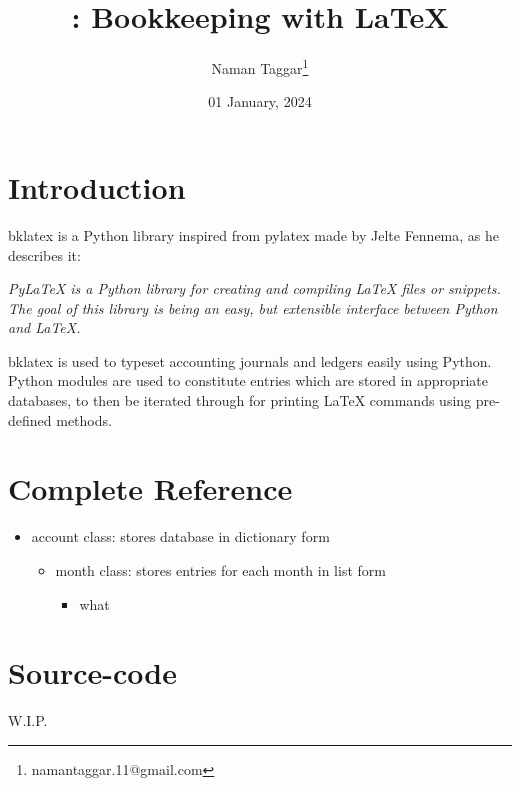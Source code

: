 \documentclass[a4paper, 10pt]{article}
\title{{\ttfamily \bklatex}: Bookkeeping with {\LaTeX}}
\author{Naman Taggar\footnote{{\ttfamily namantaggar.11@gmail.co}m}}
\date{01 January, 2024}
\newcommand{\bklatex}{{\ttfamily bklatex}}
\begin{document}
	\maketitle
	
	\tableofcontents
	
	\section{Introduction}
	\label{sec:intro}
	
	{\bklatex} is a Python library inspired from {\ttfamily pylatex} made by Jelte Fennema, as he describes it:
	\begin{center}
		\parbox{.8\linewidth}{
			{\itshape PyLaTeX is a Python library for creating and compiling {\LaTeX} files or snippets. The goal of this library is being an easy, but extensible interface between Python and {\LaTeX}.}
		}
	\end{center}
	{\bklatex} is used to typeset accounting journals and ledgers easily using Python. Python modules are used to constitute entries which are stored in appropriate databases, to then be iterated through for printing {\LaTeX} commands using pre-defined methods.
	
	\section{Complete Reference}
	\begin{itemize}
		\item {\ttfamily account} class: stores database in dictionary form
		\begin{itemize}
			\item {\ttfamily month} class: stores entries for each month in list form
			\begin{itemize}
				\item {\ttfamily what}
			\end{itemize}
		\end{itemize}
	\end{itemize}
	
	
	\section{Source-code}
	\lstset{firstnumber = last} W.I.P.
\end{document}
